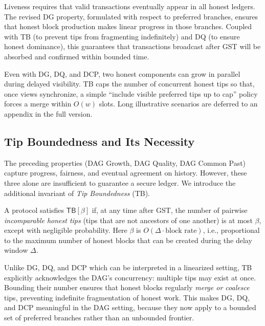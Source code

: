 \begin{remark}
Liveness requires that valid transactions eventually appear in all honest ledgers. 
The revised DG property, formulated with respect to preferred branches, 
ensures that honest block production makes linear progress in those branches. 
Coupled with TB (to prevent tips from fragmenting indefinitely) 
and DQ (to ensure honest dominance), this guarantees that transactions 
broadcast after GST will be absorbed and confirmed within bounded time. 
\end{remark}







\begin{remark}
Even with DG, DQ, and DCP, two honest components can grow in parallel during delayed visibility. 
TB caps the number of concurrent honest tips so that, once views synchronize, a simple ``include visible preferred tips up to cap'' policy forces a merge within $O(w)$ slots.
Long illustrative scenarios are deferred to an appendix in the full version.
\end{remark}


\subsection{Tip Boundedness and Its Necessity}%
\label{app:tip-boundedness}
\label{app:TB}

The preceding properties (DAG Growth, DAG Quality, DAG Common Past) capture
progress, fairness, and eventual agreement on history. However, these three
alone are insufficient to guarantee a secure ledger. We introduce the additional
invariant of \emph{Tip Boundedness} (TB).

\begin{definition}
A protocol satisfies $\mathsf{TB}[\beta]$ if, at any time after GST, the number
of pairwise \emph{incomparable honest tips} (tips that are not ancestors of one
another) is at most $\beta$, except with negligible probability. Here $\beta$ is
$O(\Delta \cdot \text{block rate})$, i.e., proportional to the maximum number of
honest blocks that can be created during the delay window $\Delta$.
\end{definition}

\begin{remark}
Unlike DG, DQ, and DCP which can be interpreted in a linearized setting,
TB explicitly acknowledges the DAG’s concurrency: multiple tips may
exist at once. Bounding their number ensures that honest blocks regularly
\emph{merge or coalesce} tips, preventing indefinite fragmentation of honest
work. This makes DG, DQ, and DCP meaningful in the DAG setting, because they
now apply to a bounded set of preferred branches rather than an unbounded
frontier.
\end{remark}

